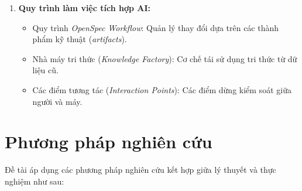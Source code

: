 \documentclass[13pt,a4paper,oneside]{extreport}
\numberwithin{equation}{chapter}
\numberwithin{figure}{chapter}
\numberwithin{table}{chapter}
\begin{document}
\begin{enumerate}
    \item \textbf{Quy trình làm việc tích hợp AI:}
    \begin{itemize}
        \item Quy trình \textit{OpenSpec Workflow}: Quản lý thay đổi dựa trên các thành phẩm kỹ thuật (\textit{artifacts}).
        \item Nhà máy tri thức (\textit{Knowledge Factory}): Cơ chế tái sử dụng tri thức từ dữ liệu cũ.
        \item Các điểm tương tác (\textit{Interaction Points}): Các điểm dừng kiểm soát giữa người và máy.
    \end{itemize}
\end{enumerate}

\section*{Phương pháp nghiên cứu}

Đề tài áp dụng các phương pháp nghiên cứu kết hợp giữa lý thuyết và thực nghiệm như sau:
\end{document}
